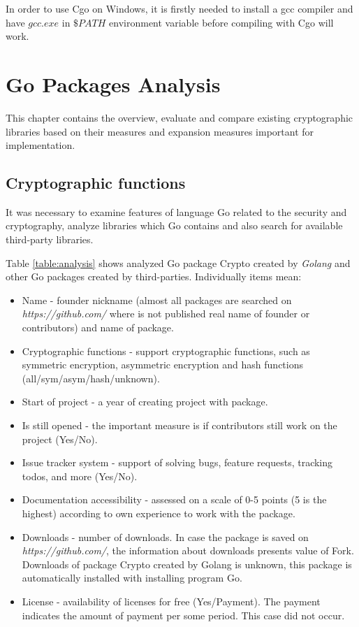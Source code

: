 \documentclass[
  digital, %
  notable,   %
  lof,     %
  lot,     %
]{fithesis3}
\begin{document}
In order to use Cgo on Windows, it is firstly needed to install a gcc compiler and have 
$gcc.exe$ in $\$PATH$ environment variable before compiling with Cgo will work.

\nocite{cgo-command}
\nocite{bloggolangorg}
\nocite{cgo-wiki}

\nocite{chisnall2012go}
\nocite{balbaert_2012}
\nocite{summerfield_2012}
\nocite{harris_2015}
\nocite{kozyra_2014}

\chapter{Go Packages Analysis} %
This chapter contains the overview, evaluate and compare existing cryptographic libraries based on 
their measures and expansion measures important for implementation.

\section{Cryptographic functions}
It was necessary to examine features of language Go related to the security and cryptography, analyze 
libraries which Go contains and also search for available third-party libraries. 

Table \ref{table:analysis} shows analyzed Go package Crypto created by \textit{Golang} and other Go 
packages created by third-parties. Individually items mean:
\vskip0.1in
\begin{itemize}[leftmargin=2em,rightmargin=1em,itemsep=0.75\parskip,parsep=0em,topsep=0em,partopsep=0em]
\item Name - founder nickname (almost all packages are searched on \textit{https://github.com/} where is not published real name of founder or contributors) and name of package.
\item Cryptographic functions - support cryptographic functions, such as symmetric encryption, asymmetric encryption and hash functions (all/sym/asym/hash/unknown).
\item Start of project - a year of creating project with package.
\item Is still opened - the important measure is if contributors still work on the project (Yes/No).
\item Issue tracker system - support of solving bugs, feature requests, tracking todos, and more (Yes/No).
\item Documentation accessibility - assessed on a scale of 0-5 points (5 is the highest) according to own experience to work with the package.
\item Downloads - number of downloads. In case the package is saved on \textit{https://github.com/}, the information about downloads presents value of Fork. Downloads of package Crypto created by Golang is unknown, this package is automatically installed with installing program Go.  
\item License - availability of licenses for free (Yes/Payment). The payment indicates the amount of payment per some period. This case did not occur.
\end{itemize}
\vskip0.1in
\end{document}
